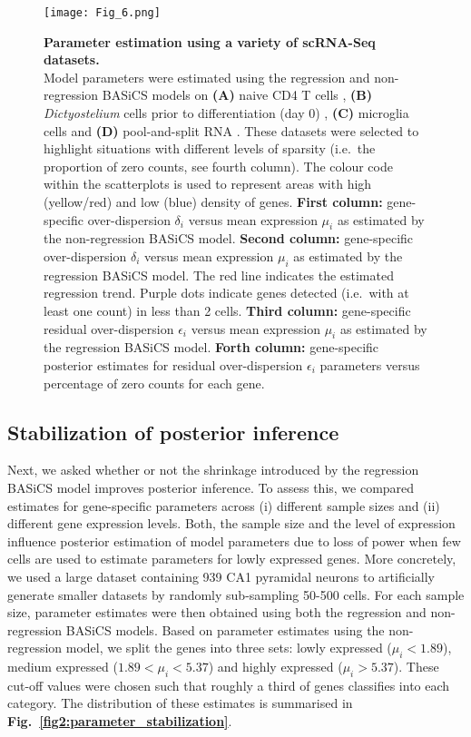 \begin{figure}[!h]
\centering
\texttt{[image: Fig\_6.png]}
\caption[Parameter estimation using a variety of scRNA-Seq datasets]{\textbf{Parameter estimation using a variety of scRNA-Seq datasets.}\\
Model parameters were estimated using the regression and non-regression BASiCS models on \textbf{(A)} naive CD4\plus{} T cells \citep{Martinez-jimenez2017}, \textbf{(B)} \textit{Dictyostelium} cells prior to differentiation (day 0) \citep{Antolovic2017}, \textbf{(C)} microglia cells \citep{Zeisel2015} and \textbf{(D)} pool-and-split RNA \citep{Grun2014}. These datasets were selected to highlight situations with different levels of sparsity (i.e.~the proportion of zero counts, see fourth column). The colour code within the scatterplots is used to represent areas with high (yellow/red) and low (blue) density of genes. \textbf{First column:} gene-specific over-dispersion $\delta_i$ versus mean expression $\mu_i$ as estimated by the non-regression BASiCS model. \textbf{Second column:} gene-specific over-dispersion $\delta_i$ versus mean expression $\mu_i$ as estimated by the regression BASiCS model. The red line indicates the estimated regression trend. Purple dots indicate genes detected (i.e.~with at least one count) in less than 2 cells. \textbf{Third column:} gene-specific residual over-dispersion $\epsilon_i$ versus mean expression $\mu_i$ as estimated by the regression BASiCS model. \textbf{Forth column:} gene-specific posterior estimates for residual over-dispersion $\epsilon_i$ parameters versus percentage of zero counts for each gene.\\}
\label{fig2:datasets}
\end{figure}

\newpage

\subsection{Stabilization of posterior inference}

Next, we asked whether or not the shrinkage introduced by the regression BASiCS model improves posterior inference. To assess this, we compared estimates for gene-specific parameters across (i) different sample sizes and (ii) different gene expression levels. Both, the sample size and the level of expression influence posterior estimation of model parameters due to loss of power when few cells are used to estimate parameters for lowly expressed genes. More concretely, we used a large dataset containing 939 CA1 pyramidal neurons \citep{Zeisel2015} to artificially generate smaller datasets by randomly sub-sampling 50-500 cells. For each sample size, parameter estimates were then obtained using both the regression and non-regression BASiCS models. 
Based on parameter estimates using the non-regression model, we split the genes into three sets: lowly expressed ($\mu_i<1.89$), medium expressed ($1.89<\mu_i<5.37$) and highly expressed ($\mu_i>5.37$). These cut-off values were chosen such that roughly a third of genes classifies into each category. The distribution of these estimates is summarised in \textbf{Fig.~\ref{fig2:parameter_stabilization}}. \\

